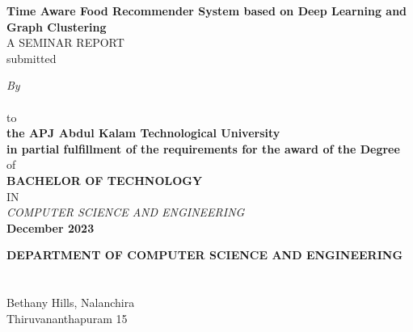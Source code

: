 \begin{titlepage}
    \begin{center}
    {\Large\sf \textbf{\textcolor[rgb]{0,0,0}{{Time Aware Food Recommender System based on Deep Learning and Graph Clustering}}}}\\[5ex]
    \vspace{0.7 cm}
    A SEMINAR REPORT\\
    submitted
    
    {\small \textcolor[rgb]{0,0,0}{\emph{By}} \\[1ex]
    {\sf {}}} \\
    \vspace{0.5 cm}
    to
    \\
    \vspace{0.5 cm}
    \textbf{the APJ Abdul Kalam Technological University \\
        in partial fulfillment of the requirements for the award of the Degree }\\
    \vspace{0.5 cm}
    of
    \\
    \textbf{BACHELOR OF TECHNOLOGY}
    \\
    IN 
    \\
    \textit{COMPUTER SCIENCE AND ENGINEERING}
    \\
    \textbf{ December 2023}
    \vspace{0.2 cm}
    
    \begin{figure}[ht]
    \begin{center}
    \end{center}
    \end{figure}
    
    {\sf \textbf{\textcolor[rgb]{0,0,0}{DEPARTMENT OF COMPUTER SCIENCE AND ENGINEERING}}}\\[0.5ex]
    {\sf {\textcolor[rgb]{0,0,0}{MAR BASELIOS COLLEGE OF ENGINEERING \& TECHNOLOGY}}}\\[0.4ex]
    {\sf {\textcolor[rgb]{0,0,0}{(Autonomous)}}}\\[0.4ex]
    Bethany Hills, Nalanchira\\
    {\sf \textcolor[rgb]{0,0,0}{Thiruvananthapuram 15}}\\[0.5ex]
    
    \end{center}
    \end{titlepage}
    